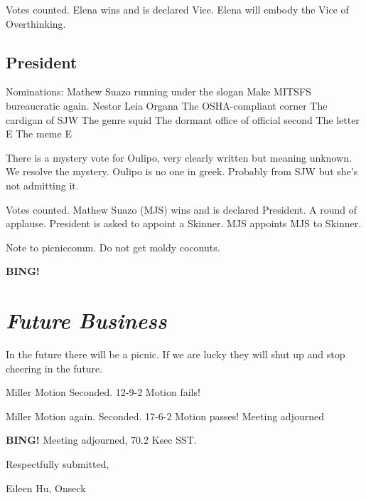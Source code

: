 \documentclass[10pt]{article}
\newcommand{\bing}{{\bf BING!} }
\newcommand{\goto}[1]{\bing \vskip 12pt \section*{{\em{#1}}}}
\newcommand{\onseck}{Eileen Hu, Onseck}
\begin{document}
Votes counted. Elena wins and is declared Vice. Elena will embody the Vice of Overthinking.

\subsection*{President}

Nominations:
Mathew Suazo running under the slogan Make MITSFS bureaucratic again.
Nestor
Leia Organa
The OSHA-compliant corner
The cardigan of SJW
The genre squid
The dormant office of official second
The letter E
The meme E

There is a mystery vote for Oulipo, very clearly written but meaning unknown. We resolve the mystery. Oulipo is no one in greek. Probably from SJW but she's not admitting it.

Votes counted. Mathew Suazo (MJS) wins and is declared President. 
A round of applause.
President is asked to appoint a Skinner.
MJS appoints MJS to Skinner.

Note to picniccomm. Do not get moldy coconuts.

\goto{Future Business}

In the future there will be a picnic. If we are lucky they will shut up and stop cheering in the future.

Miller Motion
Seconded.
12-9-2
Motion fails!

Miller Motion again.
Seconded.
17-6-2
Motion passes! Meeting adjourned


\bing
\noindent
Meeting adjourned, 70.2 Ksec SST.

\vspace{18pt}

\centerline{Respectfully submitted,}
\centerline{\onseck}
\end{document}
